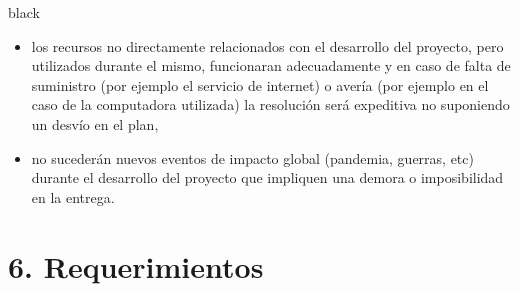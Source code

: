 \documentclass[
11pt, %
]{charter}
\begin{document}
\begin{consigna}{black}
\begin{itemize}
	\item los recursos no directamente relacionados con el desarrollo del proyecto, pero utilizados durante el mismo, funcionaran adecuadamente y en caso de falta de suministro (por ejemplo el servicio de internet) o avería (por ejemplo en el caso de la computadora utilizada) la resolución será expeditiva no suponiendo un desvío en el plan,
	\item no sucederán nuevos eventos de impacto global (pandemia, guerras, etc) durante el desarrollo del proyecto que impliquen una demora o imposibilidad en la entrega.
\end{itemize}


\end{consigna}

\section{6. Requerimientos}
\label{sec:requerimientos}
\end{document}
